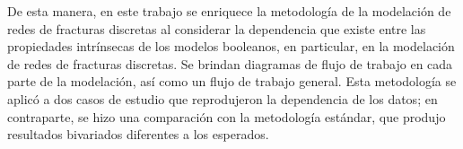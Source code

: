 De esta manera, en este trabajo se enriquece la metodolog\'ia de la modelaci\'on de redes de fracturas discretas al considerar la dependencia que existe entre las propiedades intr\'insecas de los modelos booleanos, en particular, en la modelaci\'on de redes de fracturas discretas.
Se brindan diagramas de flujo de trabajo en cada parte de la modelaci\'on, as\'i como un flujo de trabajo general.
Esta metodolog\'ia se aplic\'o a dos casos de estudio que reprodujeron la dependencia de los datos; en contraparte, se hizo una comparaci\'on con la metodolog\'ia est\'andar, que produjo resultados bivariados diferentes a los esperados.

